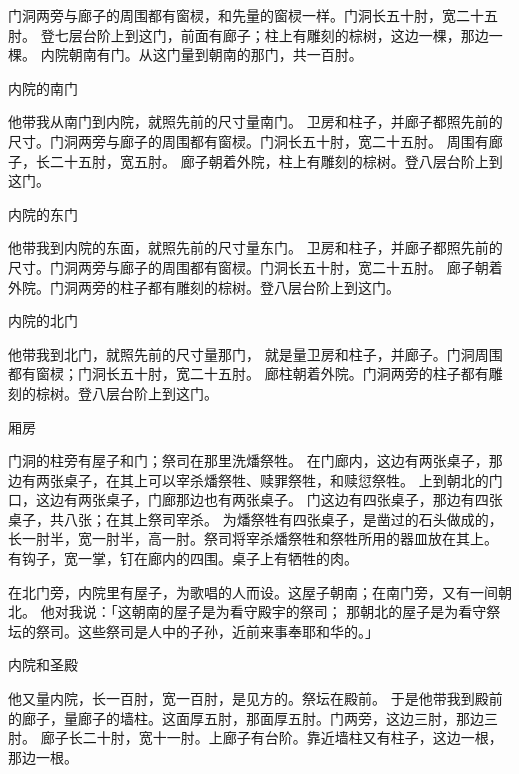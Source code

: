 {门洞两旁与廊子的周围都有窗棂，和先量的窗棂一样。门洞长五十肘，宽二十五肘。
登七层台阶上到这门，前面有廊子；柱上有雕刻的棕树，这边一棵，那边一棵。
内院朝南有门。从这门量到朝南的那门，共一百肘。
\par }{\SH 内院的南门
\par }{\PP {}他带我从南门到内院，就照先前的尺寸量南门。
卫房和柱子，并廊子都照先前的尺寸。门洞两旁与廊子的周围都有窗棂。门洞长五十肘，宽二十五肘。
周围有廊子，长二十五肘，宽五肘。
廊子朝着外院，柱上有雕刻的棕树。登八层台阶上到这门。
\par }{\SH 内院的东门
\par }{\PP {}他带我到内院的东面，就照先前的尺寸量东门。
卫房和柱子，并廊子都照先前的尺寸。门洞两旁与廊子的周围都有窗棂。门洞长五十肘，宽二十五肘。
廊子朝着外院。门洞两旁的柱子都有雕刻的棕树。登八层台阶上到这门。
\par }{\SH 内院的北门
\par }{\PP {}他带我到北门，就照先前的尺寸量那门，
就是量卫房和柱子，并廊子。门洞周围都有窗棂；门洞长五十肘，宽二十五肘。
廊柱朝着外院。门洞两旁的柱子都有雕刻的棕树。登八层台阶上到这门。
\par }{\SH 厢房
\par }{\PP {}门洞的柱旁有屋子和门；祭司在那里洗燔祭牲。
在门廊内，这边有两张桌子，那边有两张桌子，在其上可以宰杀燔祭牲、赎罪祭牲，和赎愆祭牲。
上到朝北的门口，这边有两张桌子，门廊那边也有两张桌子。
门这边有四张桌子，那边有四张桌子，共八张；在其上祭司宰杀{}。
为燔祭牲有四张桌子，是凿过的石头做成的，长一肘半，宽一肘半，高一肘。祭司将宰杀燔祭牲和{}祭牲所用的器皿放在其上。
有钩子，宽一掌，钉在廊内的四围。桌子上有牺牲的肉。
\par }{\PP {}在北门旁，内院里有屋子，为歌唱的人而设。这屋子朝南；在南门旁，又有一间朝北。
他对我说：「这朝南的屋子是为看守殿宇的祭司；
那朝北的屋子是为看守祭坛的祭司。这些祭司是{}人中{}的子孙，近前来事奉耶和华的。」
\par }{\SH 内院和圣殿
\par }{\PP {}他又量内院，长一百肘，宽一百肘，是见方的。祭坛在殿前。
于是他带我到殿前的廊子，量廊子的墙柱。这面厚五肘，那面厚五肘。门两旁，这边三肘，那边三肘。
廊子长二十肘，宽十一肘。上廊子有台阶。靠近墙柱又有柱子，这边一根，那边一根。

}
